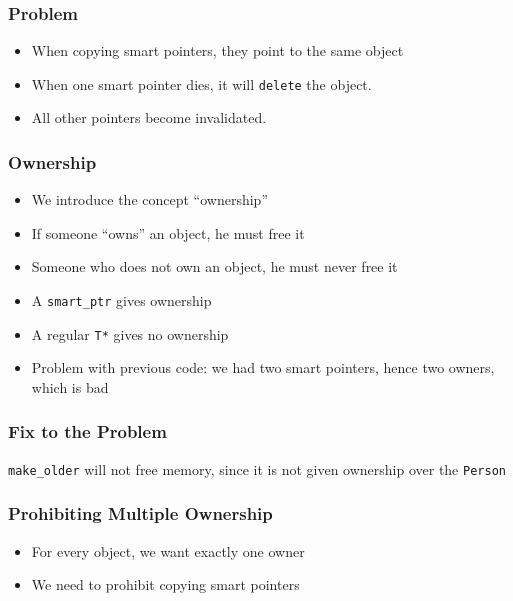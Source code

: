\begin{frame}
  \frametitle{Problem}
  \begin{center}
  \end{center}
  \begin{itemize}
    \item When copying smart pointers, they point to the same object
    \item When one smart pointer dies, it will {\tt delete} the object.
    \item All other pointers become invalidated.      
  \end{itemize}
\end{frame}

\begin{frame}
  \frametitle{Ownership}
  \begin{itemize}
    \item We introduce the concept ``ownership''
    \item If someone ``owns'' an object, he must free it
    \item Someone who does not own an object, he must never free it
    \item A {\tt smart\_ptr} gives ownership
    \item A regular {\tt T*} gives no ownership
    \item Problem with previous code: we had two smart pointers, hence two owners, which is bad
  \end{itemize}
\end{frame}

\begin{frame}
  \frametitle{Fix to the Problem}
  \begin{center}
    \texttt{make\_older} will not free memory, since it is not given ownership over the \texttt{Person}
  \end{center}
\end{frame}

\begin{frame}
  \frametitle{Prohibiting Multiple Ownership}
  \begin{itemize}
    \item For every object, we want exactly one owner
    \item We need to prohibit copying smart pointers
  \end{itemize}
\end{frame}

